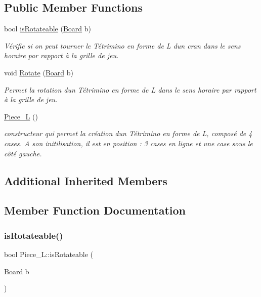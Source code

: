 \subsection*{Public Member Functions}
\begin{DoxyCompactItemize}
\item 
bool \hyperlink{classPiece__L_a34954ce32a27bdadb4d56ca7f3d82cba}{is\+Rotateable} (\hyperlink{classBoard}{Board} b)
\begin{DoxyCompactList}\small\item\em Vérifie si on peut tourner le Tétrimino en forme de L d\textquotesingle{}un cran dans le sens horaire par rapport à la grille de jeu. \end{DoxyCompactList}\item 
void \hyperlink{classPiece__L_aa865e9d2c6c468ac2921d6adb88f4d1b}{Rotate} (\hyperlink{classBoard}{Board} b)
\begin{DoxyCompactList}\small\item\em Permet la rotation d\textquotesingle{}un Tétrimino en forme de L dans le sens horaire par rapport à la grille de jeu. \end{DoxyCompactList}\item 
\mbox{\label{classPiece__L_a2cd2017561857128dfc8838fc90e3e0b}} 
\hyperlink{classPiece__L_a2cd2017561857128dfc8838fc90e3e0b}{Piece\+\_\+L} ()
\begin{DoxyCompactList}\small\item\em constructeur qui permet la création d\textquotesingle{}un Tétrimino en forme de L, composé de 4 cases. A son initilisation, il est en position \+: 3 cases en ligne et une case sous le côté gauche. \end{DoxyCompactList}\end{DoxyCompactItemize}
\subsection*{Additional Inherited Members}


\subsection{Member Function Documentation}
\mbox{\label{classPiece__L_a34954ce32a27bdadb4d56ca7f3d82cba}} 
\subsubsection{\texorpdfstring{is\+Rotateable()}{isRotateable()}}
{\footnotesize\ttfamily bool Piece\+\_\+\+L\+::is\+Rotateable (\begin{DoxyParamCaption}\item[{\hyperlink{classBoard}{Board}}]{b }\end{DoxyParamCaption})\hspace{0.3cm}{\ttfamily [virtual]}}



